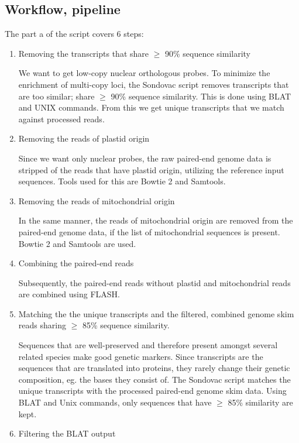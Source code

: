 \begin{enumerate}
\section{Workflow, pipeline}

The part a of the script covers 6 steps: 

\begin{enumerate}
\item Removing the transcripts that share $\geq$ 90\% sequence similarity

We want to get low-copy nuclear orthologous probes. To minimize the enrichment of multi-copy loci, the Sondovac script removes transcripts that 
are too similar; share $\geq$ 90\% sequence similarity. This is done using BLAT and UNIX commands. From this we get unique transcripts that we match against processed reads. 

\item Removing the reads of plastid origin

Since we want only nuclear probes, the raw paired-end genome data is stripped of the reads that have plastid origin, utilizing the reference input sequences. Tools used for 
this are Bowtie 2 and Samtools. 

\item Removing the reads of mitochondrial origin

In the same manner, the reads of mitochondrial origin are removed from the paired-end genome data, if the list of mitochondrial sequences is present. Bowtie 2 and Samtools are 
used. 

\item Combining the paired-end reads

Subsequently, the paired-end reads without plastid and mitochondrial reads are combined using FLASH. 

\item Matching the the unique transcripts and the filtered, combined genome skim reads sharing $\geq$ 85\% sequence similarity. 

Sequences that are well-preserved and therefore present amongst several related species make good genetic markers. Since transcripts are 
the sequences that are translated into proteins, they rarely change their genetic composition, eg. the bases they consist of. The Sondovac 
script matches the unique transcripts with the processed paired-end genome skim data. Using BLAT and Unix commands, only sequences that have 
$\geq$ 85\% similarity are kept.  

\item Filtering the BLAT output


\end{enumerate}
\end{enumerate}
